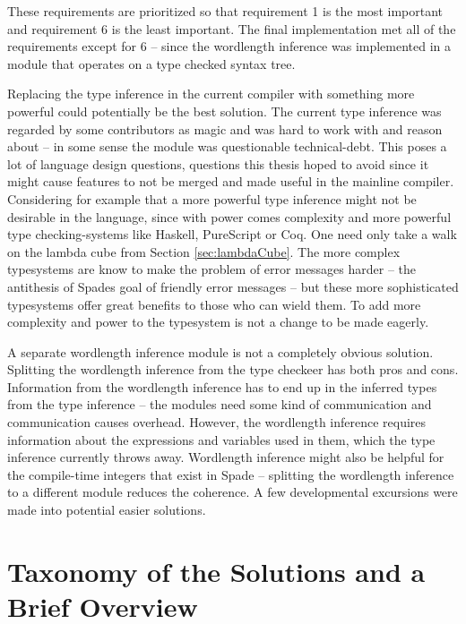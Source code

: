 These requirements are prioritized so that requirement 1 is the most important and requirement 6 is the least important. The final implementation met all of the requirements except for 6 -- since the wordlength inference was implemented in a module that operates on a type checked syntax tree.

Replacing the type inference in the current compiler with something more powerful could potentially be the best solution. The current type inference was regarded by some contributors as magic and was hard to work with and reason about -- in some sense the module was questionable technical-debt. This poses a lot of language design questions, questions this thesis hoped to avoid since it might cause features to not be merged and made useful in the mainline compiler. Considering for example that a more powerful type inference might not be desirable in the language, since with power comes complexity and more powerful type checking-systems like Haskell, PureScript or Coq. One need only take a walk on the lambda cube from Section \ref{sec:lambdaCube}. The more complex typesystems are know to make the problem of error messages harder -- the antithesis of Spades goal of friendly error messages -- but these more sophisticated typesystems offer great benefits to those who can wield them. To add more complexity and power to the typesystem is not a change to be made eagerly.

A separate wordlength inference module is not a completely obvious solution. Splitting the wordlength inference from the type checkeer has both pros and cons. Information from the wordlength inference has to end up in the inferred types from the type inference -- the modules need some kind of communication and communication causes overhead. However, the wordlength inference requires information about the expressions and variables used in them, which the type inference currently throws away. Wordlength inference might also be helpful for the compile-time integers that exist in Spade -- splitting the wordlength inference to a different module reduces the coherence. A few developmental excursions were made into potential easier solutions.

\section{Taxonomy of the Solutions and a Brief Overview}


